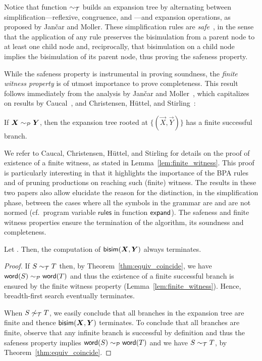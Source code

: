 Notice that function $\sim_\mathcal T$ builds an expansion tree by alternating
between simplification---reflexive, congruence, and \BPA---and
expansion operations, as proposed by Jan{\v{c}}ar and Moller.
%
These simplification rules are
\emph{safe}~\cite{janvcar1999techniques}, in the sense that the
application of any rule preserves the bisimulation from a parent node
to at least one child node and, reciprocally, that bisimulation on a
child node implies the bisimulation of its parent node, thus proving
the safeness property.

While the safeness property is instrumental in proving
soundness, the \emph{finite witness property} is of
utmost importance to prove completeness. This result follows
immediately from the analysis by Jan{\v{c}}ar and
Moller~\cite{janvcar1999techniques}, which capitalizes on results by
Caucal~\cite{caucal1986decidabilite}, and Christensen, H{\"{u}}ttel, and
Stirling~\cite{DBLP:journals/iandc/ChristensenHS95}:

\begin{lemma} 
\label{lem:finite_witness}
	If $\vec X \ProdEquiv \vec Y$, then the expansion tree rooted at
	$\{(\vec X, \vec Y)\}$ has a finite successful branch.
\end{lemma}

We refer to Caucal, Christensen, H{\"{u}}ttel, and Stirling for
details on the proof of existence of a finite witness, as stated in
Lemma~\ref{lem:finite_witness}. This proof is particularly interesting in
that it highlights the importance of the BPA rules and of pruning
productions on reaching such (finite) witness. The results in these
two papers also allow elucidate the reason for the distinction, in
the simplification phase, between the cases where all the symbols in
the grammar are and are not normed (cf.~program variable
$\mathsf{rules}$ in function $\mathsf{expand}$).
%
The safeness and finite witness properties ensure the termination of
the algorithm, its soundness and completeness.

\begin{lemma}[Termination]
  \label{lem:termination}
  Let \grmcontext. Then, the computation of $\Bisim(\vec X,\vec Y)$
  always terminates.
\end{lemma}
%
\begin{proof}
  If $S\sim_\mathcal T T$ then, by Theorem~\ref{thm:equiv_coincide}, we
  have $\mathsf{word}(S) \sim_\mathcal P \mathsf{word}(T) $ and thus the existence of a
  finite successful branch is ensured by the finite witness property
  (Lemma~\ref{lem:finite_witness}).  Hence, breadth-first search
  eventually terminates.
  
  When $S\not\sim_\mathcal T T$, we easily conclude that all branches in
  the expansion tree are finite and thence $\Bisim(\vec X,\vec Y)$
  terminates.  To conclude that all branches are finite, observe that
  any infinite branch is successful by definition and thus the
  safeness property implies $\mathsf{word}(S) \sim_\mathcal P \mathsf{word}(T)$ and we have
  $S\sim_\mathcal T T$, by Theorem~\ref{thm:equiv_coincide}.
\end{proof}

